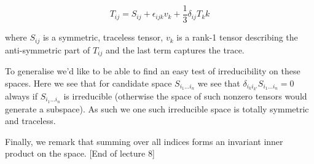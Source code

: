 \documentclass{article}
\theoremstyle{definition}
\begin{document}
$$ T_{ij} = S_{ij} + \epsilon_{ijk} v_k + \frac{1}{3} \delta_{ij} T_kk $$

where $S_{ij}$ is a symmetric, traceless tensor, $v_k$ is a rank-1 tensor
describing the anti-symmetric part of $T_{ij}$ and the last term captures the
trace.

To generalise we'd like to be able to find an easy test of irreducibility on
these spaces. Here we see that for candidate space $S_{i_1 \dots i_n}$ we see
that $\delta_{i_k i_{k'}} S_{i_1 \dots i_n} = 0$ always if $S_{i_1 \dots i_n}$
is irreducible (otherwise the space of such nonzero tensors would generate a
subspace). As such we one such irreducible space is totally symmetric and
traceless. 

Finally, we remark that summing over all indices forms an invariant inner
product on the space. [End of lecture 8] 
\end{document}
